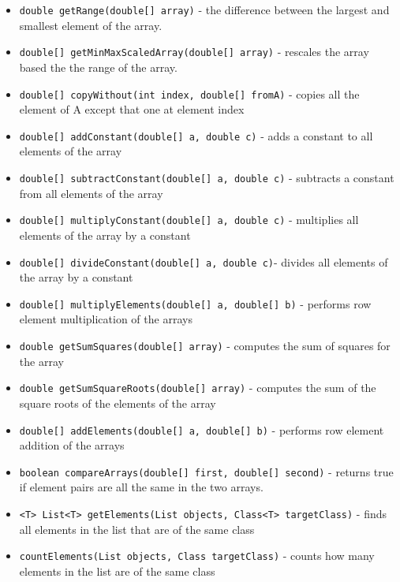 \documentclass[
]{book}
\providecommand{\tightlist}{%
  \setlength{\itemsep}{0pt}\setlength{\parskip}{0pt}}
\theoremstyle{definition}
\theoremstyle{definition}
\theoremstyle{definition}
\theoremstyle{definition}
\theoremstyle{remark}
\begin{document}
\begin{itemize}
\tightlist
\item
  \texttt{double\ getRange(double{[}{]}\ array)} - the difference between the largest and smallest element of the array.
\item
  \texttt{double{[}{]}\ getMinMaxScaledArray(double{[}{]}\ array)} - rescales the array based the the range of the array.
\item
  \texttt{double{[}{]}\ copyWithout(int\ index,\ double{[}{]}\ fromA)} - copies all the element of A except that one at element index
\item
  \texttt{double{[}{]}\ addConstant(double{[}{]}\ a,\ double\ c)} - adds a constant to all elements of the array
\item
  \texttt{double{[}{]}\ subtractConstant(double{[}{]}\ a,\ double\ c)} - subtracts a constant from all elements of the array
\item
  \texttt{double{[}{]}\ multiplyConstant(double{[}{]}\ a,\ double\ c)} - multiplies all elements of the array by a constant
\item
  \texttt{double{[}{]}\ divideConstant(double{[}{]}\ a,\ double\ c)}- divides all elements of the array by a constant
\item
  \texttt{double{[}{]}\ multiplyElements(double{[}{]}\ a,\ double{[}{]}\ b)} - performs row element multiplication of the arrays
\item
  \texttt{double\ getSumSquares(double{[}{]}\ array)} - computes the sum of squares for the array
\item
  \texttt{double\ getSumSquareRoots(double{[}{]}\ array)} - computes the sum of the square roots of the elements of the array
\item
  \texttt{double{[}{]}\ addElements(double{[}{]}\ a,\ double{[}{]}\ b)} - performs row element addition of the arrays
\item
  \texttt{boolean\ compareArrays(double{[}{]}\ first,\ double{[}{]}\ second)} - returns true if element pairs are all the same in the two arrays.
\item
  \texttt{\textless{}T\textgreater{}\ List\textless{}T\textgreater{}\ getElements(List\ objects,\ Class\textless{}T\textgreater{}\ targetClass)} - finds all elements in the list that are of the same class
\item
  \texttt{countElements(List\ objects,\ Class\ targetClass)} - counts how many elements in the list are of the same class
\end{itemize}
\end{document}
